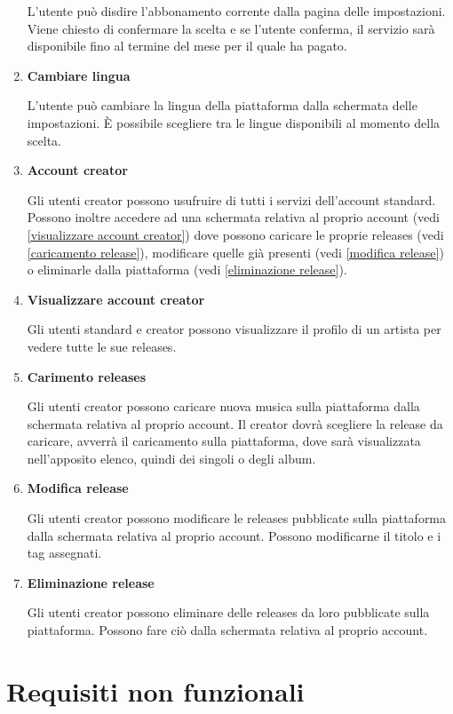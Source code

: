 \documentclass[a4paper,12pt]{article}
\begin{document}
\begin{enumerate}[label=\textbf{RF\arabic*}\;, ref=\textbf{RF\arabic*}]
    L'utente può disdire l'abbonamento corrente dalla pagina delle impostazioni. Viene chiesto di confermare la scelta e se l’utente conferma, il servizio sarà disponibile fino al termine del mese per il quale ha pagato.
    \item \label{lingue} \textbf{Cambiare lingua}
    
    L'utente può cambiare la lingua della piattaforma dalla schermata delle impostazioni. È possibile scegliere tra le lingue disponibili al momento della scelta.
    \item \label{account creator} \textbf{Account creator}
    
    Gli utenti creator possono usufruire di tutti i servizi dell’account standard. Possono inoltre accedere ad una schermata relativa al proprio account (vedi \ref{visualizzare account creator}) dove possono caricare le proprie releases (vedi \ref{caricamento release}), modificare quelle già presenti (vedi \ref{modifica release}) o eliminarle dalla piattaforma (vedi \ref{eliminazione release}).
    \item \label{visualizzare account creator} \textbf{Visualizzare account creator}
    
    Gli utenti standard e creator possono visualizzare il profilo di un artista per vedere tutte le sue releases.
    \item \label{caricamento release} \textbf{Carimento releases}
    
    Gli utenti creator possono caricare nuova musica sulla piattaforma dalla schermata relativa al proprio account. Il creator dovrà scegliere la release da caricare, avverrà il caricamento sulla piattaforma, dove sarà visualizzata nell’apposito elenco, quindi dei singoli o degli album.
    \item \label{modifica release} \textbf{Modifica release}
    
    Gli utenti creator possono modificare le releases pubblicate sulla piattaforma dalla schermata relativa al proprio account. Possono modificarne il titolo e i tag assegnati. 
    \item \label{eliminazione release} \textbf{Eliminazione release}
    
    Gli utenti creator possono eliminare delle releases da loro pubblicate sulla piattaforma. Possono fare ciò dalla schermata relativa al proprio account.
\end{enumerate}

\newpage
\section{Requisiti non funzionali}
\end{document}
